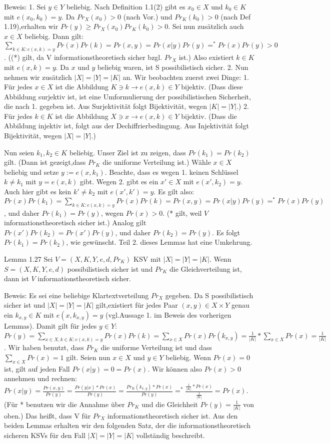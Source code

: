 \documentclass[a4paper]{article}
\begin{document}
\begin{multicols}{3}
    Beweis:
    1. Sei $y\in Y$ beliebig. Nach Definition 1.1(2) gibt es $x_0\in X$ und $k_0\in K$ mit $e(x_0,k_0)=y$. Da $Pr_X(x_0)>0$ (nach Vor.) und $Pr_K(k_0)>0$ (nach Def 1.19),erhalten wir $Pr(y)\geq Pr_X(x_0)Pr_K(k_0)>0$. Sei nun zusätzlich auch $x\in X$ beliebig. Dann gilt: $\sum_{k\in K:e(x,k)=y} Pr(x)Pr(k)= Pr(x,y)= Pr(x|y)Pr(y)=^* Pr(x)Pr(y)> 0$. ((*) gilt, da V informationstheoretisch sicher bzgl. $Pr_X$ ist.) Also existiert $k\in K$ mit $e(x,k)=y$. Da $x$ und $y$ beliebig waren, ist S possibilistisch sicher.
    2. Nun nehmen wir zusätzlich $|X|=|Y|=|K|$ an. Wir beobachten zuerst zwei Dinge:
    1. Für jedes $x\in X$ ist die Abbildung $K\ni k \rightarrow e(x,k)\in Y$  bijektiv. (Dass diese Abbildung surjektiv ist, ist eine Umformulierung der possibilistischen Sicherheit, die nach 1. gegeben ist. Aus Surjektivität folgt Bijektivität, wegen $|K|=|Y|$.)
    2. Für jedes $k\in K$ ist die Abbildung $X\ni x \rightarrow e(x,k)\in Y$ bijektiv. (Dass die Abbildung injektiv ist, folgt aus der Dechiffrierbedingung. Aus Injektivität folgt Bijektivität, wegen $|X|=|Y|$.)

    Nun seien $k_1,k_2\in K$ beliebig. Unser Ziel ist zu zeigen, dass $Pr(k_1)=Pr(k_2)$ gilt. (Dann ist gezeigt,dass $Pr_K$ die uniforme Verteilung ist.) Wähle $x\in X$ beliebig und setze $y:=e(x,k_1)$. Beachte, dass es wegen 1. keinen Schlüssel $k\not=k_1$ mit $y=e(x,k)$ gibt. Wegen 2. gibt es ein $x'\in X$ mit $e(x',k_2)=y$. Auch hier gibt es kein $k'\not=k_2$ mit $e(x',k')=y$. Es gilt also: $Pr(x)Pr(k_1)=\sum_{k\in K:e(x,k)=y} Pr(x)Pr(k) = Pr(x,y) = Pr(x|y)Pr(y) =^* Pr(x)Pr(y)$, und daher $Pr(k_1)=Pr(y)$, wegen $Pr(x)>0$. (* gilt, weil $V$ informationstheoretisch sicher ist.) Analog gilt $Pr(x')Pr(k_2)=Pr(x')Pr(y)$, und daher $Pr(k_2)=Pr(y)$. Es folgt $Pr(k_1)=Pr(k_2)$, wie gewünscht.
    Teil 2. dieses Lemmas hat eine Umkehrung.

    Lemma 1.27 Sei $V=(X,K,Y,e,d,Pr_K)$ KSV mit $|X|=|Y|=|K|$. Wenn $S=(X,K,Y,e,d)$ possibilistisch sicher ist und $Pr_K$ die Gleichverteilung ist, dann ist $V$ informationstheoretisch sicher.

    Beweis: Es sei eine beliebige Klartextverteilung $Pr_X$ gegeben. Da S possibilistisch sicher ist und $|X|=|Y|=|K|$ gilt,existiert für jedes Paar $(x,y)\in X\times Y$ genau ein $k_{x,y}\in K$ mit $e(x,k_{x,y}) =y$ (vgl.Aussage 1. im Beweis des vorherigen Lemmas).
    Damit gilt für jedes $y\in Y$:$Pr(y)=\sum_{x\in X,k\in K:e(x,k)=y} Pr(x)Pr(k) =\sum_{x\in X} Pr(x) Pr(k_{x,y})=\frac{1}{|K|}* \sum_{x\in X} Pr(x) = \frac{1}{|K|}$.
    Wir haben benutzt, dass $Pr_K$ die uniforme Verteilung ist und dass $\sum_{x\in X} Pr(x) = 1$ gilt.
    Seien nun $x\in X$ und $y\in Y$ beliebig. Wenn $Pr(x)=0$ ist, gilt auf jeden Fall $Pr(x|y)=0=Pr(x)$. Wir können also $Pr(x)> 0$ annehmen und rechnen: $Pr(x|y) =\frac{Pr(x,y)}{Pr(y)}=\frac{Pr(y|x)*Pr(x)}{Pr(y)}=\frac{Pr_K(k_{x,y})*Pr(x)}{Pr(y)}=^* \frac{\frac{1}{|K|}*Pr(x)}{\frac{1}{|K|}}=Pr(x)$.
    (Für * benutzen wir die Annahme über $Pr_K$ und die Gleichheit $Pr(y)=\frac{1}{|K|}$ von oben.) Das heißt, dass V  für $Pr_X$ informationstheoretisch sicher ist.
    Aus den beiden Lemmas erhalten wir den folgenden Satz, der die informationstheoretisch sicheren KSVs für den Fall $|X|=|Y|=|K|$ vollständig beschreibt.


\end{multicols}
\end{document}
